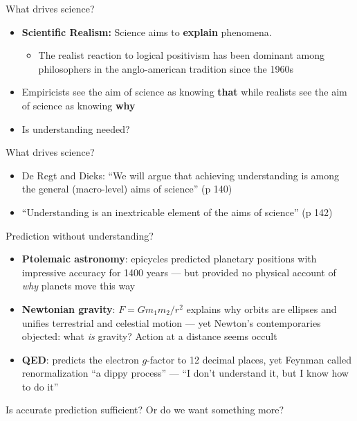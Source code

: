 \documentclass[fleqn]{beamer}
\begin{document}
\begin{frame}{What drives science?}

  \begin{itemize}
  \item \textbf{Scientific Realism:} Science aims to \textbf{explain}
    phenomena.
    \begin{itemize}
    \item The realist reaction to logical positivism has been dominant
      among philosophers in the anglo-american tradition since the
      1960s
    \end{itemize}
  \end{itemize}

\end{frame}

\begin{frame}

  \begin{itemize}
  \item Empiricists see the aim of science as knowing \textbf{that}
    while realists see the aim of science as knowing \textbf{why}
  \item Is understanding needed?
  \end{itemize}

\end{frame}

\begin{frame}{What drives science?}

  \begin{itemize}
  \item De Regt and Dieks: ``We will argue that achieving
    understanding is among the general (macro-level) aims of science''
    (p 140)
  \item ``Understanding is an inextricable element of the aims of
    science'' (p 142)
  \end{itemize}

\end{frame}

\begin{frame}{Prediction without understanding?}

  \begin{itemize}
  \item \textbf{Ptolemaic astronomy}: epicycles predicted planetary
    positions with impressive accuracy for 1400 years --- but provided
    no physical account of \emph{why} planets move this way
  \item \textbf{Newtonian gravity}: $F = Gm_1m_2/r^2$ explains why
    orbits are ellipses and unifies terrestrial and celestial motion
    --- yet Newton's contemporaries objected: what \emph{is} gravity?
    Action at a distance seems occult
  \item \textbf{QED}: predicts the electron $g$-factor to 12 decimal
    places, yet Feynman called renormalization ``a dippy process'' ---
    ``I don't understand it, but I know how to do it''
  \end{itemize}

  \vspace{0.5em}
  \small Is accurate prediction sufficient? Or do we want something
  more?

\end{frame}
\end{document}
